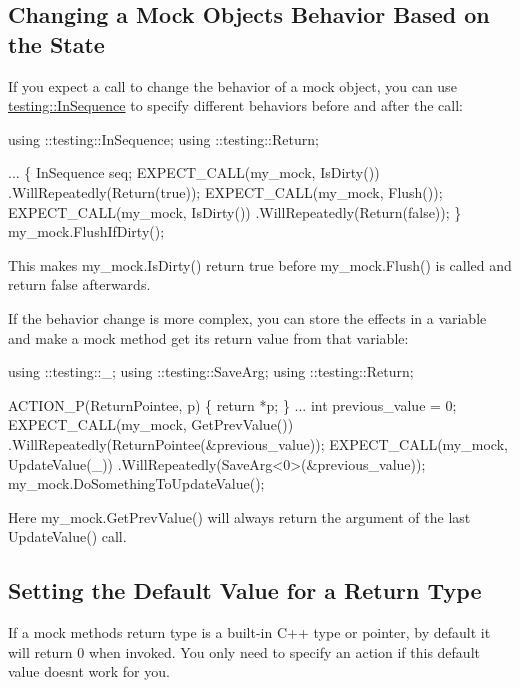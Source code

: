 \subsection*{Changing a Mock Object\textquotesingle{}s Behavior Based on the State}

If you expect a call to change the behavior of a mock object, you can use {\ttfamily \hyperlink{classtesting_1_1InSequence}{testing\+::\+In\+Sequence}} to specify different behaviors before and after the call\+:


\begin{DoxyCode}
using ::testing::InSequence;
using ::testing::Return;

...
  \{
    InSequence seq;
    EXPECT\_CALL(my\_mock, IsDirty())
        .WillRepeatedly(Return(true));
    EXPECT\_CALL(my\_mock, Flush());
    EXPECT\_CALL(my\_mock, IsDirty())
        .WillRepeatedly(Return(false));
  \}
  my\_mock.FlushIfDirty();
\end{DoxyCode}


This makes {\ttfamily my\+\_\+mock.\+Is\+Dirty()} return {\ttfamily true} before {\ttfamily my\+\_\+mock.\+Flush()} is called and return {\ttfamily false} afterwards.

If the behavior change is more complex, you can store the effects in a variable and make a mock method get its return value from that variable\+:


\begin{DoxyCode}
using ::testing::\_;
using ::testing::SaveArg;
using ::testing::Return;

ACTION\_P(ReturnPointee, p) \{ return *p; \}
...
  int previous\_value = 0;
  EXPECT\_CALL(my\_mock, GetPrevValue())
      .WillRepeatedly(ReturnPointee(&previous\_value));
  EXPECT\_CALL(my\_mock, UpdateValue(\_))
      .WillRepeatedly(SaveArg<0>(&previous\_value));
  my\_mock.DoSomethingToUpdateValue();
\end{DoxyCode}


Here {\ttfamily my\+\_\+mock.\+Get\+Prev\+Value()} will always return the argument of the last {\ttfamily Update\+Value()} call.

\subsection*{Setting the Default Value for a Return Type}

If a mock method\textquotesingle{}s return type is a built-\/in C++ type or pointer, by default it will return 0 when invoked. You only need to specify an action if this default value doesn\textquotesingle{}t work for you.

